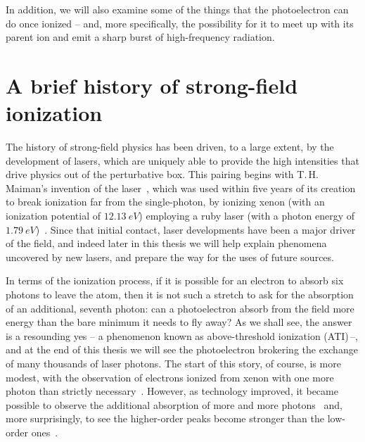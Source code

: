In addition, we will also examine some of the things that the photoelectron can do once ionized -- and, more specifically, the possibility for it to meet up with its parent ion and emit a sharp burst of high-frequency radiation. 



\section{A brief history of strong-field ionization}

The history of strong-field physics has been driven, to a large extent, by the development of lasers, which are uniquely able to provide the high intensities that drive physics out of the perturbative box. This pairing begins with T.\,H. Maiman's invention of the laser~\cite{ maiman_laser_1960}, which was used within five years of its creation to break ionization far from the single-photon, by ionizing xenon (with an ionization potential of $\SI{12.13}{eV}$) employing a ruby laser (with a photon energy of $\SI{1.79}{eV}$)~\cite{voronov_initial-multiphoton_1965, voronov_follow-up-multiphoton_1966}. Since that initial contact, laser developments have been a major driver of the field, and indeed later in this thesis we will help explain phenomena uncovered by new lasers, and prepare the way for the uses of future sources.


In terms of the ionization process, if it is possible for an electron to absorb six photons to leave the atom, then it is not such a stretch to ask for the absorption of an additional, seventh photon: can a photoelectron absorb from the field more energy than the bare minimum  it needs to fly away? As we shall see, the answer is a resounding yes -- a phenomenon known as above-threshold ionization (ATI)\,--, and at the end of this thesis we will see the photoelectron brokering the exchange of many thousands of laser photons. The start of this story, of course, is more modest, with the observation of electrons ionized from xenon with one more photon than strictly necessary~\cite{agostini_ati-initial_1979}. However, as technology improved, it became possible to observe the additional absorption of more and more photons~\cite{agostini_ati-development_1988} and, more surprisingly, to see the higher-order peaks become stronger than the low-order ones~\cite{agostini_ati-development_1988, petite_ati-nonperturbative_1987}.


